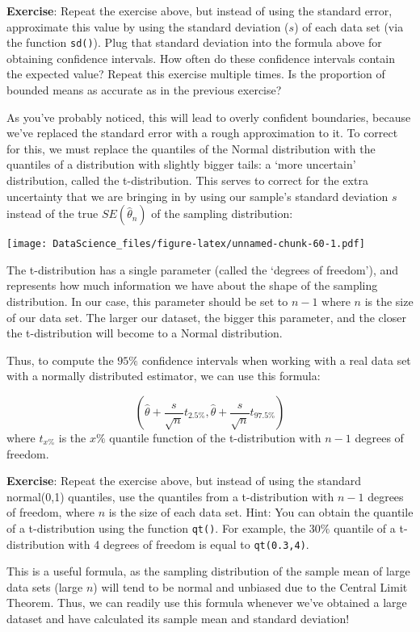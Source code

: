 \documentclass[
]{book}
\begin{document}
\textbf{Exercise}: Repeat the exercise above, but instead of using the standard error, approximate this value by using the standard deviation (\(s\)) of each data set (via the function \texttt{sd()}). Plug that standard deviation into the formula above for obtaining confidence intervals. How often do these confidence intervals contain the expected value? Repeat this exercise multiple times. Is the proportion of bounded means as accurate as in the previous exercise?

As you've probably noticed, this will lead to overly confident boundaries, because we've replaced the standard error with a rough approximation to it. To correct for this, we must replace the quantiles of the Normal distribution with the quantiles of a distribution with slightly bigger tails: a `more uncertain' distribution, called the t-distribution. This serves to correct for the extra uncertainty that we are bringing in by using our sample's standard deviation \(s\) instead of the true \(SE(\hat{\theta}_n)\) of the sampling distribution:

\texttt{[image: DataScience\_files/figure-latex/unnamed-chunk-60-1.pdf]}

The t-distribution has a single parameter (called the `degrees of freedom'), and represents how much information we have about the shape of the sampling distribution. In our case, this parameter should be set to \(n-1\) where \(n\) is the size of our data set. The larger our dataset, the bigger this parameter, and the closer the t-distribution will become to a Normal distribution.

Thus, to compute the \(95\%\) confidence intervals when working with a real data set with a normally distributed estimator, we can use this formula:

\[(\hat{\theta} + \frac{s}{\sqrt{n}}t_{2.5\%}, \hat{\theta} + \frac{s}{\sqrt{n}}t_{97.5\%})\]
where \(t_{x\%}\) is the \(x\%\) quantile function of the t-distribution with \(n-1\) degrees of freedom.

\textbf{Exercise}: Repeat the exercise above, but instead of using the standard normal(0,1) quantiles, use the quantiles from a t-distribution with \(n-1\) degrees of freedom, where \(n\) is the size of each data set. Hint: You can obtain the quantile of a t-distribution using the function \texttt{qt()}. For example, the \(30\%\) quantile of a t-distribution with 4 degrees of freedom is equal to \texttt{qt(0.3,4)}.

This is a useful formula, as the sampling distribution of the sample mean of large data sets (large \(n\)) will tend to be normal and unbiased due to the Central Limit Theorem. Thus, we can readily use this formula whenever we've obtained a large dataset and have calculated its sample mean and standard deviation!
\end{document}
